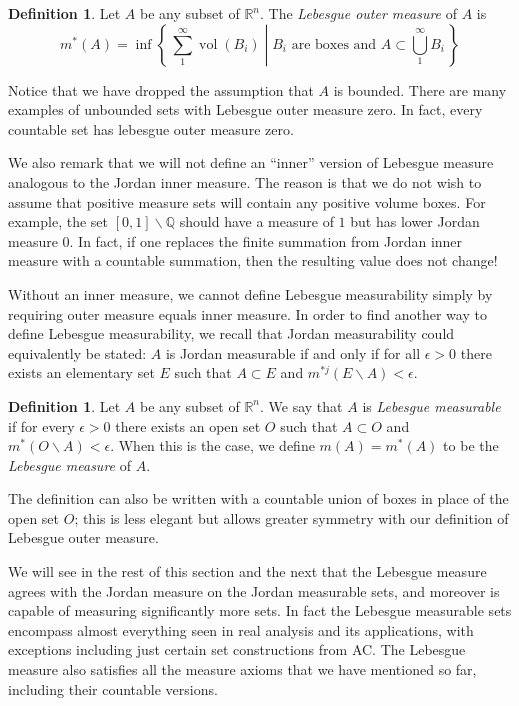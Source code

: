 \documentclass[11pt,oneside]{amsbook}
\newcommand{\set}[1]{\left\{\,#1\,\right\}}
\renewcommand{\setminus}{\smallsetminus}
\newcommand{\QQ}{\mathbb Q}
\newcommand{\RR}{\mathbb R}
\DeclareMathOperator{\vol}{vol}
\theoremstyle{definition}
\theoremstyle{plain}
\theoremstyle{definition}
\newtheorem{defn}[thm]{Definition}
\theoremstyle{remark}
\numberwithin{equation}{section}
\numberwithin{figure}{section}
\begin{document}
\begin{defn}
  Let $A$ be any subset of $\RR^n$. The \emph{Lebesgue outer measure} of $A$ is
  \[m^*(A)=\inf\set{\left.\sum_1^\infty \vol(B_i)\;\right|\;\text{$B_i$ are boxes and }A\subset\bigcup_1^\infty B_i}
  \]
\end{defn}

Notice that we have dropped the assumption that $A$ is bounded. There are many examples of unbounded sets with Lebesgue outer measure zero. In fact, every countable set has lebesgue outer measure zero.

We also remark that we will not define an ``inner'' version of Lebesgue measure analogous to the Jordan inner measure. The reason is that we do not wish to assume that positive measure sets will contain any positive volume boxes. For example, the set $[0,1]\setminus\QQ$ should have a measure of $1$ but has lower Jordan measure $0$. In fact, if one replaces the finite summation from Jordan inner measure with a countable summation, then the resulting value does not change!

Without an inner measure, we cannot define Lebesgue measurability simply by requiring outer measure equals inner measure. In order to find another way to define Lebesgue measurability, we recall that Jordan measurability could equivalently be stated: $A$ is Jordan measurable if and only if for all $\epsilon>0$ there exists an elementary set $E$ such that $A\subset E$ and $m^{*j}(E\setminus A)<\epsilon$.

\begin{defn}
  Let $A$ be any subset of $\RR^n$. We say that $A$ is \emph{Lebesgue measurable} if for every $\epsilon>0$ there exists an open set $O$ such that $A\subset O$ and $m^*(O\setminus A)<\epsilon$. When this is the case, we define $m(A)=m^*(A)$ to be the \emph{Lebesgue measure} of $A$.
\end{defn}

The definition can also be written with a countable union of boxes in place of the open set $O$; this is less elegant but allows greater symmetry with our definition of Lebesgue outer measure.

We will see in the rest of this section and the next that the Lebesgue measure agrees with the Jordan measure on the Jordan measurable sets, and moreover is capable of measuring significantly more sets. In fact the Lebesgue measurable sets encompass almost everything seen in real analysis and its applications, with exceptions including just certain set constructions from AC.  The Lebesgue measure also satisfies all the measure axioms that we have mentioned so far, including their countable versions.
\end{document}
